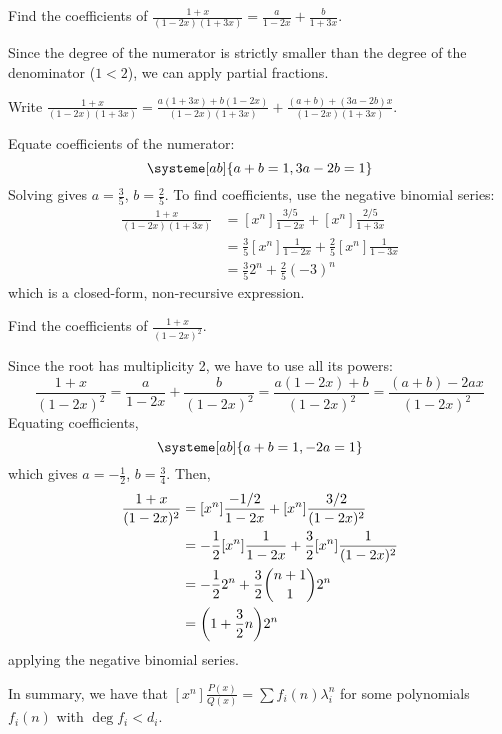 \documentclass[class=math239,notes,tikz]{agony}
\begin{document}
\begin{example}
  Find the coefficients of $\frac{1+x}{(1-2x)(1+3x)} = \frac{a}{1-2x} + \frac{b}{1+3x}$.
\end{example}
\begin{sol}
  Since the degree of the numerator is strictly smaller than the degree of the denominator ($1 < 2$),
  we can apply partial fractions.

  Write $\frac{1+x}{(1-2x)(1+3x)} = \frac{a(1+3x) + b(1-2x)}{(1-2x)(1+3x)}
    + \frac{(a+b) + (3a-2b)x}{(1-2x)(1+3x)}$.

  Equate coefficients of the numerator:
  \[ \systeme[ab]{a+b=1,3a-2b=1} \]
  Solving gives $a = \frac35$, $b = \frac25$.
  To find coefficients, use the negative binomial series:
  \begin{align*}
    [x^n]\frac{1+x}{(1-2x)(1+3x)}
     & = [x^n]\frac{3/5}{1-2x} + [x^n]\frac{2/5}{1+3x}           \\
     & = \frac35[x^n]\frac{1}{1-2x} + \frac25[x^n]\frac{1}{1-3x} \\
     & = \frac352^n + \frac25(-3)^n
  \end{align*}
  which is a closed-form, non-recursive expression.
\end{sol}

\begin{example}
  Find the coefficients of $\frac{1+x}{(1-2x)^2}$.
\end{example}
\begin{sol}
  Since the root has multiplicity 2, we have to use all its powers:
  \[
    \frac{1+x}{(1-2x)^2} = \frac{a}{1-2x} + \frac{b}{(1-2x)^2}
    = \frac{a(1-2x) + b}{(1-2x)^2} = \frac{(a+b) - 2ax}{(1-2x)^2}
  \]
  Equating coefficients,
  \[ \systeme[ab]{a+b=1,-2a=1} \]
  which gives $a=-\frac12$, $b=\frac34$. Then,
  \begin{align*}
    [x^n]\frac{1+x}{(1-2x)^2}
     & = [x^n]\frac{-1/2}{1-2x} + [x^n]\frac{3/2}{(1-2x)^2}           \\
     & = -\frac12[x^n]\frac{1}{1-2x} + \frac32[x^n]\frac{1}{(1-2x)^2} \\
     & = -\frac12 2^n + \frac32\binom{n+1}{1}2^n                      \\
     & = \qty(1+\frac32n)2^n
  \end{align*}
  applying the negative binomial series.
\end{sol}

In summary, we have that $[x^n]\frac{P(x)}{Q(x)} = \sum f_i(n)\lambda_i^n$
for some polynomials $f_i(n)$ with $\deg f_i < d_i$.
\end{document}
